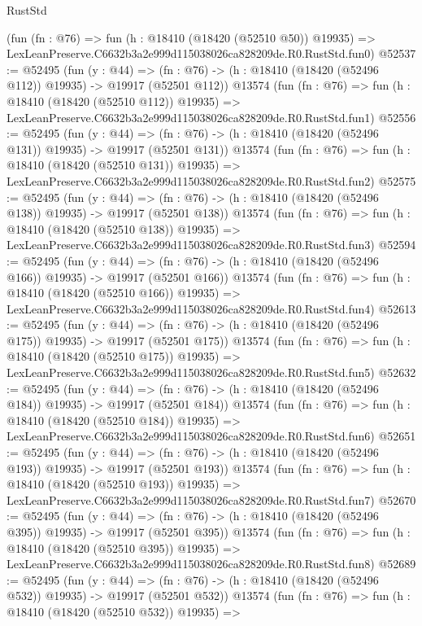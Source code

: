 \begin{lexlean}{RustStd}
\begin{coremodule}
    (fun (fn : @76) =>
    fun (h : @18410 (@18420 (@52510 @50)) @19935) =>
    LexLeanPreserve.C6632b3a2e999d115038026ca828209de.R0.RustStd.fun0)
@52537 := @52495
    (fun (y : @44) =>
    (fn : @76) -> (h : @18410 (@18420 (@52496 @112)) @19935) -> @19917 (@52501 @112))
    @13574
    (fun (fn : @76) =>
    fun (h : @18410 (@18420 (@52510 @112)) @19935) =>
    LexLeanPreserve.C6632b3a2e999d115038026ca828209de.R0.RustStd.fun1)
@52556 := @52495
    (fun (y : @44) =>
    (fn : @76) -> (h : @18410 (@18420 (@52496 @131)) @19935) -> @19917 (@52501 @131))
    @13574
    (fun (fn : @76) =>
    fun (h : @18410 (@18420 (@52510 @131)) @19935) =>
    LexLeanPreserve.C6632b3a2e999d115038026ca828209de.R0.RustStd.fun2)
@52575 := @52495
    (fun (y : @44) =>
    (fn : @76) -> (h : @18410 (@18420 (@52496 @138)) @19935) -> @19917 (@52501 @138))
    @13574
    (fun (fn : @76) =>
    fun (h : @18410 (@18420 (@52510 @138)) @19935) =>
    LexLeanPreserve.C6632b3a2e999d115038026ca828209de.R0.RustStd.fun3)
@52594 := @52495
    (fun (y : @44) =>
    (fn : @76) -> (h : @18410 (@18420 (@52496 @166)) @19935) -> @19917 (@52501 @166))
    @13574
    (fun (fn : @76) =>
    fun (h : @18410 (@18420 (@52510 @166)) @19935) =>
    LexLeanPreserve.C6632b3a2e999d115038026ca828209de.R0.RustStd.fun4)
@52613 := @52495
    (fun (y : @44) =>
    (fn : @76) -> (h : @18410 (@18420 (@52496 @175)) @19935) -> @19917 (@52501 @175))
    @13574
    (fun (fn : @76) =>
    fun (h : @18410 (@18420 (@52510 @175)) @19935) =>
    LexLeanPreserve.C6632b3a2e999d115038026ca828209de.R0.RustStd.fun5)
@52632 := @52495
    (fun (y : @44) =>
    (fn : @76) -> (h : @18410 (@18420 (@52496 @184)) @19935) -> @19917 (@52501 @184))
    @13574
    (fun (fn : @76) =>
    fun (h : @18410 (@18420 (@52510 @184)) @19935) =>
    LexLeanPreserve.C6632b3a2e999d115038026ca828209de.R0.RustStd.fun6)
@52651 := @52495
    (fun (y : @44) =>
    (fn : @76) -> (h : @18410 (@18420 (@52496 @193)) @19935) -> @19917 (@52501 @193))
    @13574
    (fun (fn : @76) =>
    fun (h : @18410 (@18420 (@52510 @193)) @19935) =>
    LexLeanPreserve.C6632b3a2e999d115038026ca828209de.R0.RustStd.fun7)
@52670 := @52495
    (fun (y : @44) =>
    (fn : @76) -> (h : @18410 (@18420 (@52496 @395)) @19935) -> @19917 (@52501 @395))
    @13574
    (fun (fn : @76) =>
    fun (h : @18410 (@18420 (@52510 @395)) @19935) =>
    LexLeanPreserve.C6632b3a2e999d115038026ca828209de.R0.RustStd.fun8)
@52689 := @52495
    (fun (y : @44) =>
    (fn : @76) -> (h : @18410 (@18420 (@52496 @532)) @19935) -> @19917 (@52501 @532))
    @13574
    (fun (fn : @76) =>
    fun (h : @18410 (@18420 (@52510 @532)) @19935) =>

\end{coremodule}
\end{lexlean}
